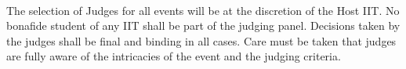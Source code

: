 
\paragraph{}
The selection of Judges for all events will be at the discretion of the Host IIT. No bonafide student of any IIT shall be part of the judging panel. Decisions taken by the judges shall be final and binding in all cases. Care must be taken that judges are fully aware of the intricacies of the event and the judging criteria.